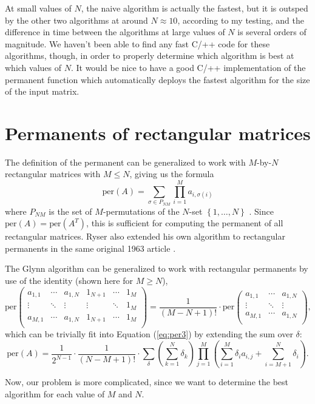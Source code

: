 \documentclass{article}
\begin{document}
At small values of $N$, the naive algorithm is actually the fastest, but it is outsped by the other
two algorithms at around $N \approx 10$, according to my testing, and the difference in time between
the algorithms at large values of $N$ is several orders of magnitude. We haven't been able to find
any fast C/++ code for these algorithms, though, in order to properly determine which algorithm is
best at which values of $N$. It would be nice to have a good C/++ implementation of the permanent
function which automatically deploys the fastest algorithm for the size of the input matrix.

\section*{Permanents of rectangular matrices}

The definition of the permanent can be generalized to work with $M$-by-$N$ rectangular
matrices with $M \leq N$, giving us the formula
\begin{equation} \label{eq:rectper1}
    \text{per}(A) = \sum_{\sigma \in P_{NM}}{\prod_{i=1}^M{a_{i,{\sigma(i)}}}}
\end{equation}
where $P_{NM}$ is the set of $M$-permutations of the $N$-set $\left\{1,\dots,N\right\}$
\cite{wiki:permanent}.  Since $\text{per}(A) = \text{per}(A^T)$, this is sufficient for computing
the permanent of all rectangular matrices. Ryser also extended his own algorithm to rectangular
permanents in the same original 1963 article \cite{wiki:computing,ryser1963}.

The Glynn algorithm can be generalized to work with rectangular permanents by use of the
identity (shown here for $M \geq N$),
\begin{equation}
    {\text{per}}\left(
        \begin{matrix}
            a_{1,1} & \cdots & a_{1,N} & 1_{N+1} & \cdots & 1_M \\
            \vdots & \ddots & \vdots & \vdots & \ddots & 1_M \\
            a_{M,1} & \cdots & a_{1,N} & 1_{N+1} & \cdots & 1_M \\
        \end{matrix}
    \right)
    = \frac{1}{\left(M - N + 1\right)!} \cdot {\text{per}}\left(
        \begin{matrix}
            a_{1,1} & \cdots & a_{1,N} \\
            \vdots & \ddots & \vdots \\
            a_{M,1} & \cdots & a_{1,N} \\
        \end{matrix}
    \right),
\end{equation}
which can be trivially fit into Equation (\ref{eq:per3}) by extending the sum over $\delta$:
\begin{equation} \label{eq:rectper3}
    \text{per}(A) = \frac{1}{2^{N-1}} \cdot \frac{1}{\left(N - M + 1\right)!} \cdot \sum_{\delta}{
        \left(\sum_{k=1}^N{\delta_k}\right)
        \prod_{j=1}^M{\left(\sum_{i=1}^M{\delta_i a_{i,j}} + \sum_{i=M+1}^N{\delta_i}\right)}
    }.
\end{equation}

Now, our problem is more complicated, since we want to determine the best algorithm for each value
of $M$ and $N$.



\end{document}
